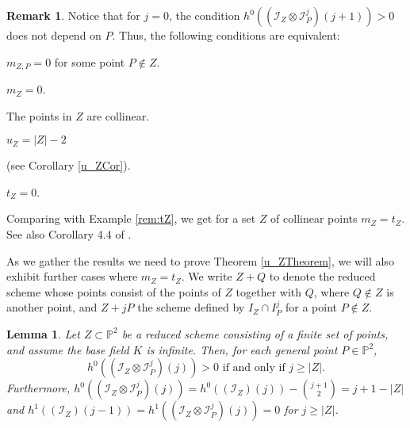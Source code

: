 \documentclass[12pt]{amsart}
\numberwithin{equation}{section}
\newtheorem{lemma}[theorem]{Lemma}
\theoremstyle{definition}
\newtheorem{remark}[theorem]{Remark}
\begin{document}
\begin{remark}
    \label{rem:prop mult ind}
Notice that for $j = 0$, the condition $h^0((\mathcal I_Z \otimes \mathcal I_P^j)(j+1)) > 0$ does 
not depend on $P$. Thus,  the following conditions are equivalent: 
\begin{itemize}
\item[(a)] $m_{Z,P} = 0$ for some point $P \notin Z$.

\item[(b)] $m_Z = 0$. 

\item[(c)] The points in $Z$ are collinear. 

\item[(d)] $u_Z = |Z|-2$ {\color{black} (see Corollary \ref{u_ZCor}).

\item[(e)] $t_Z = 0$.   }
\end{itemize}
Comparing with Example \ref{rem:tZ}, we get for a set $Z$ of collinear points $m_Z = t_Z$. {\color{black} See also Corollary 4.4 of \cite{FV2}. }
\end{remark}

As we gather the results we need to prove Theorem \ref{u_ZTheorem}, we will also exhibit further cases where $m_Z = t_Z$. 
We write $Z + Q$ to denote the reduced scheme whose points consist of the points of $Z$ together with $Q$, 
where $Q\notin Z$ is another point, and $Z+jP$ the scheme defined by $I_Z\cap I_P^j$ for a point $P\not\in Z$.

\begin{lemma} \label{lem:initial degree}
Let $Z  \subset { \ensuremath{\mathbb{P}}}^2$ be a reduced scheme  consisting of a finite set of points,
and assume the base field $K$ is infinite. Then, for each general point $P \in { \ensuremath{\mathbb{P}}}^2$,    
\[
h^0((\mathcal I_Z \otimes \mathcal I_P^j)(j)) > 0 \text{ if and only if } j \ge |Z|. 
\]  
Furthermore, $h^0((\mathcal I_Z \otimes \mathcal I_P^j)(j)) = h^0((\mathcal I_Z)(j))-\binom{j+1}{2} = j+1-|Z|$ and
$h^1((\mathcal I_Z)(j-1)) = h^1((\mathcal I_Z \otimes \mathcal I_P^j)(j)) = 0$ for $j\geq |Z|$. 
\end{lemma}
\end{document}
